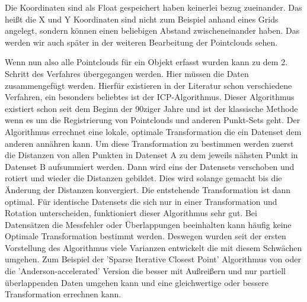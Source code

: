 \documentclass[../main.tex]{subfiles}
\begin{document}
Die Koordinaten sind als Float gespeichert haben keinerlei bezug zueinander.
Das heißt die X und Y Koordinaten sind nicht zum Beispiel anhand eines Grids 
angelegt, sondern können einen beliebigen Abstand zwischeneinander haben. Das
werden wir auch später in der weiteren Bearbeitung der Pointclouds sehen.

Wenn nun also alle Pointclouds für ein Objekt erfasst wurden kann zu dem 2.
Schritt des Verfahres übergegangen werden. Hier müssen die Daten zusammengefügt 
werden. 
Hierfür existieren in der Literatur schon verschiedene Verfahren, ein 
besonders beliebtes ist der ICP-Algorithmus.
Dieser Algorithmus existiert schon seit dem Beginn der 90ziger Jahre und ist 
der klassische Methode wenn es um die Registrierung von Pointclouds und 
anderen Punkt-Sets geht. \cite[]{icp}
Der Algorithmus errechnet eine lokale, optimale Transformation die ein Datenset
dem anderen annähren kann. \cite{icp_og}
Um diese Transformation zu bestimmen werden zuerst die Distanzen von allen 
Punkten in Datenset A zu dem jeweils nähsten Punkt in Datenset B aufsummiert 
werden. Dann wird eins der Datensets verschoben und rotiert und wieder die 
Distanzen gebildet. Dies wird solange gemacht bis die Änderung der Distanzen 
konvergiert. Die entstehende Transformation ist dann optimal.
Für identische Datensets die sich nur in einer Transformation und Rotation 
unterscheiden, funktioniert dieser Algorithmus sehr gut. Bei Datensätzen die 
Messfehler oder Überlappungen beeinhalten kann häufig keine Optimale 
Transformation bestimmt werden.
Deswegen wurden seit der ersten Vorstellung des Algorithmus viele Varianzen
entwickelt die mit diesem Schwächen umgehen. 
Zum Beispiel der 'Sparse Iterative Closest Point' Algorithmus von \cite{Bouaziz.2013}
oder die 'Anderson-accelerated' Version die besser mit Außreißern und nur 
partiell überlappenden Daten umgehen kann und eine gleichwertige oder bessere 
Transformation errechnen kann. \cite{icp}
\end{document}
